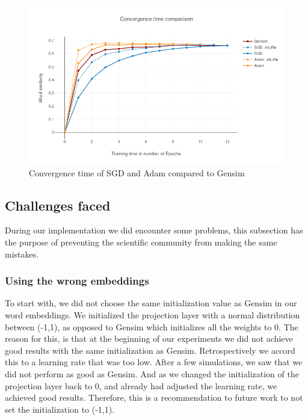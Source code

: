\documentclass[conference]{IEEEtran}
\begin{document}
\begin{figure}[h]
\centering
\includegraphics[scale=0.45]{images/gensim_vs_adam}
\caption{Convergence time of SGD and Adam compared to Gensim}
\label{fig:gensim_vs_adam}
\end{figure}\subsection{Challenges faced}
During our implementation we did encounter some problems, this subsection has the purpose of preventing the scientific community from making the same mistakes.
\subsubsection{Using the wrong embeddings}
To start with, we did not choose the same initialization value as Gensim in our word embeddings. We initialized the projection layer with a normal distribution between (-1,1), as opposed to Gensim which initializes all the weights to 0. The reason for this, is that at the beginning of our experiments we did not achieve good results with the same initialization as Gensim. Retrospectively we accord this to a learning rate that was too low. After a few simulations, we saw that we did not perform as good as Gensim. And as we changed the initialization of the projection layer back to 0, and already had adjusted the learning rate, we achieved good results. Therefore, this is a recommendation to future work to not set the initialization to (-1,1).
\end{document}
